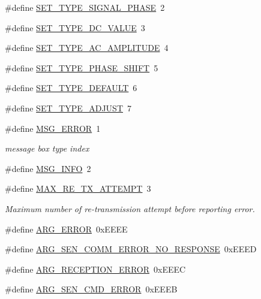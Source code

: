 \begin{DoxyCompactItemize}
\#define \hyperlink{a00090_a45f9851d4938b1ce68a1aad58d8776cc}{S\+E\+T\+\_\+\+T\+Y\+P\+E\+\_\+\+S\+I\+G\+N\+A\+L\+\_\+\+P\+H\+A\+S\+E}~2
\item 
\#define \hyperlink{a00090_a347f6ec80828b93988d22989c0df015f}{S\+E\+T\+\_\+\+T\+Y\+P\+E\+\_\+\+D\+C\+\_\+\+V\+A\+L\+U\+E}~3
\item 
\#define \hyperlink{a00090_a704f34d2cc6c149f96e9da9d2a1aa8c0}{S\+E\+T\+\_\+\+T\+Y\+P\+E\+\_\+\+A\+C\+\_\+\+A\+M\+P\+L\+I\+T\+U\+D\+E}~4
\item 
\#define \hyperlink{a00090_ada31d976cd5e22a05ba8ff5e80c16d06}{S\+E\+T\+\_\+\+T\+Y\+P\+E\+\_\+\+P\+H\+A\+S\+E\+\_\+\+S\+H\+I\+F\+T}~5
\item 
\#define \hyperlink{a00090_afd1036bf6329d2ac31913e14c1f56725}{S\+E\+T\+\_\+\+T\+Y\+P\+E\+\_\+\+D\+E\+F\+A\+U\+L\+T}~6
\item 
\#define \hyperlink{a00090_a16b6b7b5ad68ec0dd62a3c9e97f88adb}{S\+E\+T\+\_\+\+T\+Y\+P\+E\+\_\+\+A\+D\+J\+U\+S\+T}~7
\item 
\#define \hyperlink{a00090_aa8a990825a5a62c89d2fb8b08d8a1070}{M\+S\+G\+\_\+\+E\+R\+R\+O\+R}~1
\begin{DoxyCompactList}\small\item\em message box type index \end{DoxyCompactList}\item 
\#define \hyperlink{a00090_a1ddcc97224a95cec04b38b0ac866fa19}{M\+S\+G\+\_\+\+I\+N\+F\+O}~2
\item 
\#define \hyperlink{a00090_ae024113875b4670b57f70611ff982543}{M\+A\+X\+\_\+\+R\+E\+\_\+\+T\+X\+\_\+\+A\+T\+T\+E\+M\+P\+T}~3
\begin{DoxyCompactList}\small\item\em Maximum number of re-\/transmission attempt before reporting error. \end{DoxyCompactList}\item 
\#define \hyperlink{a00090_a098c8517207326db0313f33ac7c6fdd8}{A\+R\+G\+\_\+\+E\+R\+R\+O\+R}~0x\+E\+E\+E\+E
\item 
\#define \hyperlink{a00090_a5f745a08fe4d5a8336a8fd62c30e0642}{A\+R\+G\+\_\+\+S\+E\+N\+\_\+\+C\+O\+M\+M\+\_\+\+E\+R\+R\+O\+R\+\_\+\+N\+O\+\_\+\+R\+E\+S\+P\+O\+N\+S\+E}~0x\+E\+E\+E\+D
\item 
\#define \hyperlink{a00090_a6c0eafe3de1c9e7ecff5c4f93db9ab7b}{A\+R\+G\+\_\+\+R\+E\+C\+E\+P\+T\+I\+O\+N\+\_\+\+E\+R\+R\+O\+R}~0x\+E\+E\+E\+C
\item 
\#define \hyperlink{a00090_a9922eac72168ff3c8ee0b273de724049}{A\+R\+G\+\_\+\+S\+E\+N\+\_\+\+C\+M\+D\+\_\+\+E\+R\+R\+O\+R}~0x\+E\+E\+E\+B

\end{DoxyCompactItemize}

